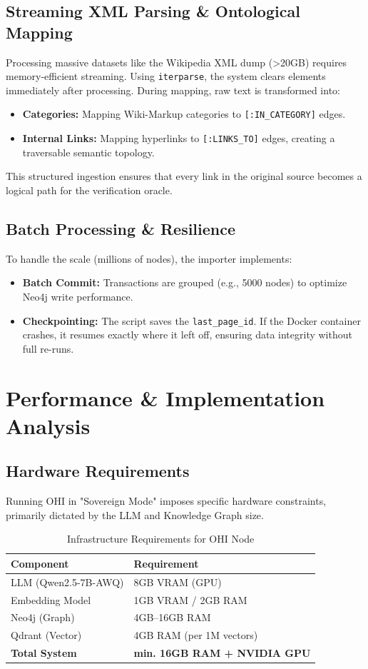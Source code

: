 \documentclass[10pt, a4paper, twocolumn]{article}
\begin{document}
\subsection{Streaming XML Parsing \& Ontological Mapping}
Processing massive datasets like the Wikipedia XML dump (>20GB) requires memory-efficient streaming. Using \texttt{iterparse}, the system clears elements immediately after processing. During mapping, raw text is transformed into:
\begin{itemize}
    \item \textbf{Categories:} Mapping Wiki-Markup categories to \texttt{[:IN\_CATEGORY]} edges.
    \item \textbf{Internal Links:} Mapping hyperlinks to \texttt{[:LINKS\_TO]} edges, creating a traversable semantic topology.
\end{itemize}
This structured ingestion ensures that every link in the original source becomes a logical path for the verification oracle.

\subsection{Batch Processing \& Resilience}
To handle the scale (millions of nodes), the importer implements:
\begin{itemize}
    \item \textbf{Batch Commit:} Transactions are grouped (e.g., 5000 nodes) to optimize Neo4j write performance.
    \item \textbf{Checkpointing:} The script saves the \texttt{last\_page\_id}. If the Docker container crashes, it resumes exactly where it left off, ensuring data integrity without full re-runs.
\end{itemize}

\section{Performance \& Implementation Analysis}

\subsection{Hardware Requirements}
Running OHI in "Sovereign Mode" imposes specific hardware constraints, primarily dictated by the LLM and Knowledge Graph size.
\begin{table}[h]
\centering
\caption{Infrastructure Requirements for OHI Node}
\begin{tabular}{@{}ll@{}}
\toprule
\textbf{Component} & \textbf{Requirement} \\ \midrule
LLM (Qwen2.5-7B-AWQ) & 8GB VRAM (GPU) \\
Embedding Model & 1GB VRAM / 2GB RAM \\
Neo4j (Graph) & 4GB--16GB RAM \\
Qdrant (Vector) & 4GB RAM (per 1M vectors) \\
\textbf{Total System} & \textbf{min. 16GB RAM + NVIDIA GPU} \\ \bottomrule
\end{tabular}
\end{table}
\end{document}
